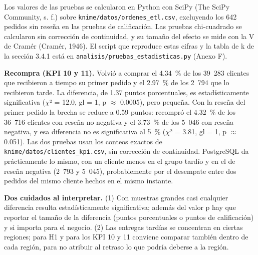 \documentclass[a4paper,stu,12pt,donotrepeattitle,floatsintext]{apa7}
\begin{document}
{\begin{longtable}
\end{longtable}
}
Los valores de las pruebas se calcularon en Python con SciPy (The SciPy Community, s. f.) sobre \texttt{knime/\allowbreak{}datos/\allowbreak{}ordenes\_\allowbreak{}etl.csv}, excluyendo los 642 pedidos sin reseña en las pruebas de calificación. Las pruebas chi-cuadrado se calcularon sin corrección de continuidad, y su tamaño del efecto se mide con la V de Cramér (Cramér, 1946). El script que reproduce estas cifras y la tabla de k de la sección 3.4.1 está en \texttt{analisis/\allowbreak{}pruebas\_\allowbreak{}estadisticas.py} (Anexo F).

\textbf{Recompra (KPI 10 y 11).} Volvió a comprar el 4.34~\% de los 39~283 clientes que recibieron a tiempo su primer pedido y el 2.97~\% de los 2~794 que lo recibieron tarde. La diferencia, de 1.37 puntos porcentuales, es estadísticamente significativa ($\chi$² = 12.0, gl = 1, p $\approx$ 0.0005), pero pequeña. Con la reseña del primer pedido la brecha se reduce a 0.59 puntos: recompró el 4.32~\% de los 36~716 clientes con reseña no negativa y el 3.73~\% de los 5~046 con reseña negativa, y esa diferencia no es significativa al 5~\% ($\chi$² = 3.81, gl = 1, p $\approx$ 0.051). Las dos pruebas usan los conteos exactos de \texttt{knime/\allowbreak{}datos/\allowbreak{}clientes\_\allowbreak{}kpi.csv}, sin corrección de continuidad. PostgreSQL da prácticamente lo mismo, con un cliente menos en el grupo tardío y en el de reseña negativa (2~793 y 5~045), probablemente por el desempate entre dos pedidos del mismo cliente hechos en el mismo instante.

\textbf{Dos cuidados al interpretar.} (1) Con muestras grandes casi cualquier diferencia resulta estadísticamente significativa; además del valor p hay que reportar el tamaño de la diferencia (puntos porcentuales o puntos de calificación) y si importa para el negocio. (2) Las entregas tardías se concentran en ciertas regiones; para H1 y para los KPI 10 y 11 conviene comparar también dentro de cada región, para no atribuir al retraso lo que podría deberse a la región.
\end{document}
